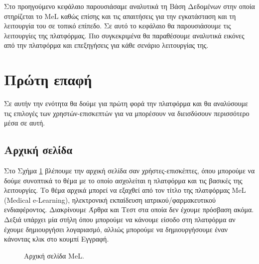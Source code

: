 

Στο προηγούμενο κεφάλαιο παρουσιάσαμε αναλυτικά τη Βάση Δεδομένων στην οποία στηρίζεται το \textlatin{MeL} καθώς επίσης και τις απαιτήσεις για την εγκατάσταση και τη λειτουργία του σε τοπικό επίπεδο. Σε αυτό το κεφάλαιο θα παρουσιάσουμε τις λειτουργίες της πλατφόρμας. Πιο συγκεκριμένα θα παραθέσουμε αναλυτικά εικόνες από την πλατφόρμα και επεξηγήσεις για κάθε σενάριο λειτουργίας της.\section{Πρώτη επαφή}
Σε αυτήν την ενότητα θα δούμε για πρώτη φορά την πλατφόρμα και θα αναλύσουμε τις επιλογές των χρηστών-επισκεπτών για να μπορέσουν να διεισδύσουν περισσότερο μέσα σε αυτή.

\subsection{Αρχική σελίδα}
Στο Σχήμα \ref{fig:start_page} βλέπουμε την αρχική σελίδα σαν χρήστες-επισκέπτες, όπου μπορούμε να δούμε συνοπτικά το θέμα με το οποίο ασχολείται η πλατφόρμα και τις βασικές της λειτουργίες. Το θέμα αρχικά μπορεί να εξαχθεί από τον τίτλο της πλατφόρμας \textlatin{MeL (Medical e-Learning),} ηλεκτρονική εκπαίδευση ιατρικού/φαρμακευτικού ενδιαφέροντος. Διακρίνουμε Άρθρα και Τεστ στα οποία δεν έχουμε πρόσβαση ακόμα. Δεξιά υπάρχει μία στήλη όπου μπορούμε να κάνουμε είσοδο στη πλατφόρμα αν έχουμε δημιουργήσει λογαριασμό, αλλιώς μπορούμε να δημιουργήσουμε έναν κάνοντας κλικ στο κουμπί Εγγραφή.

\begin{figure}[tbh]
\centering
\caption{Αρχική σελίδα \textlatin{MeL.}}
\label{fig:start_page}
\end{figure}

